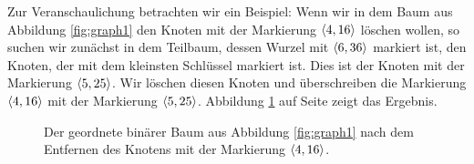 Zur Veranschaulichung betrachten wir ein Beispiel: Wenn wir in dem Baum aus Abbildung 
\ref{fig:graph1} den Knoten mit der Markierung $\pair(4,16)$ l\"oschen wollen,
so suchen wir zun\"achst in dem Teilbaum, dessen Wurzel mit $\pair(6,36)$ markiert ist, den
Knoten, der mit dem kleinsten Schl\"ussel markiert ist.  Dies ist der Knoten mit der
Markierung $\pair(5,25)$.  Wir l\"oschen diesen Knoten und \"uberschreiben die Markierung
$\pair(4,16)$ mit der Markierung $\pair(5,25)$.  Abbildung 
\ref{fig:graph2} auf Seite \pageref{fig:graph2} zeigt das Ergebnis.

\begin{figure}[!th]
  \centering
  \caption{Der geordnete bin\"arer Baum aus Abbildung 
          \ref{fig:graph1} nach dem Entfernen des Knotens mit der Markierung $\pair(4,16)$.}
  \label{fig:graph2}
\end{figure}

